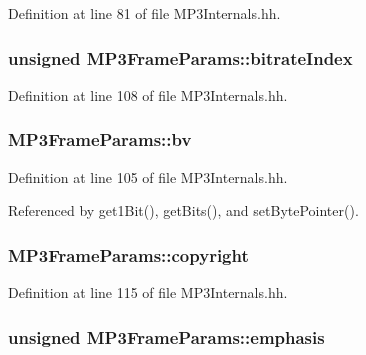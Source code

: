 Definition at line 81 of file M\+P3\+Internals.\+hh.

\subsubsection[{bitrate\+Index}]{\setlength{\rightskip}{0pt plus 5cm}unsigned M\+P3\+Frame\+Params\+::bitrate\+Index\hspace{0.3cm}{\ttfamily [private]}}\label{classMP3FrameParams_a02ca455aa0b7179d70b8d7cd75961049}


Definition at line 108 of file M\+P3\+Internals.\+hh.

\subsubsection[{bv}]{ M\+P3\+Frame\+Params\+::bv\hspace{0.3cm}{\ttfamily [private]}}\label{classMP3FrameParams_a62a7844ad65c8ffacd2c6b0c5460f649}


Definition at line 105 of file M\+P3\+Internals.\+hh.



Referenced by get1\+Bit(), get\+Bits(), and set\+Byte\+Pointer().

\subsubsection[{copyright}]{ M\+P3\+Frame\+Params\+::copyright\hspace{0.3cm}{\ttfamily [private]}}\label{classMP3FrameParams_aa36c376b5e7f957f073f3cc684b3f628}


Definition at line 115 of file M\+P3\+Internals.\+hh.

\subsubsection[{emphasis}]{\setlength{\rightskip}{0pt plus 5cm}unsigned M\+P3\+Frame\+Params\+::emphasis\hspace{0.3cm}{\ttfamily [private]}}\label{classMP3FrameParams_a9aac0048f3940afafc158008b18ed4ed}


